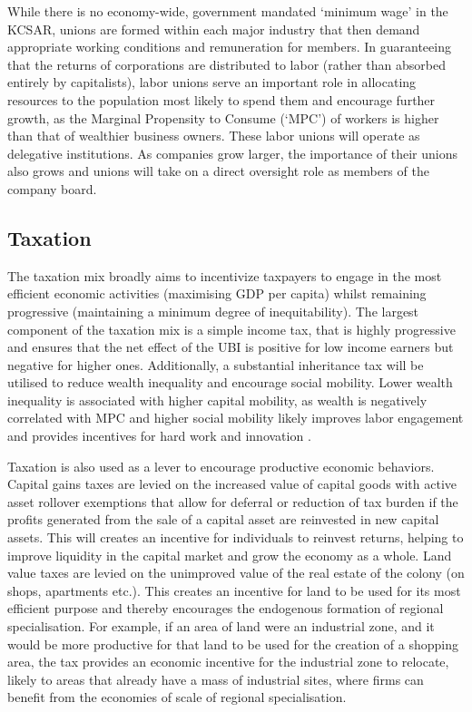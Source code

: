 \documentclass[fleqn,10pt]{Stylesheet} %
\begin{document}
While there is no economy-wide, government mandated ‘minimum wage’ in the KCSAR, unions are formed within each major industry that then demand appropriate working conditions and remuneration for members. In guaranteeing that the returns of corporations are distributed to labor (rather than absorbed entirely by capitalists), labor unions serve an important role in allocating resources to the population most likely to spend them and encourage further growth, as the Marginal Propensity to Consume (‘MPC’) of workers is higher than that of wealthier business owners. These labor unions will operate as delegative institutions. As companies grow larger, the importance of their unions also grows and unions will take on a direct oversight role as members of the company board. 

\subsection{Taxation}
The taxation mix broadly aims to incentivize taxpayers to engage in the most efficient economic activities (maximising GDP per capita) whilst remaining progressive (maintaining a minimum degree of inequitability). The largest component of the taxation mix is a simple income tax, that is highly progressive and ensures that the net effect of the UBI is positive for low income earners but negative for higher ones. Additionally, a substantial inheritance tax will be utilised to reduce wealth inequality and encourage social mobility. Lower wealth inequality is associated with higher capital mobility, as wealth is negatively correlated with MPC and higher social mobility likely improves labor engagement and provides incentives for hard work and innovation \cite{Brueckner-2018}.

Taxation is also used as a lever to encourage productive economic behaviors. Capital gains taxes are levied on the increased value of capital goods with active asset rollover exemptions that allow for deferral or reduction of tax burden if the profits generated from the sale of a capital asset are reinvested in new capital assets. This will creates an incentive for individuals to reinvest returns, helping to improve liquidity in the capital market and grow the economy as a whole. Land value taxes are levied on the unimproved value of the real estate of the colony (on shops, apartments etc.). This creates an incentive for land to be used for its most efficient purpose and thereby encourages the endogenous formation of regional specialisation. For example, if an area of land were an industrial zone, and it would be more productive for that land to be used for the creation of a shopping area, the tax provides an economic incentive for the industrial zone to relocate, likely to areas that already have a mass of industrial sites, where firms can benefit from the economies of scale of regional specialisation.
\end{document}
